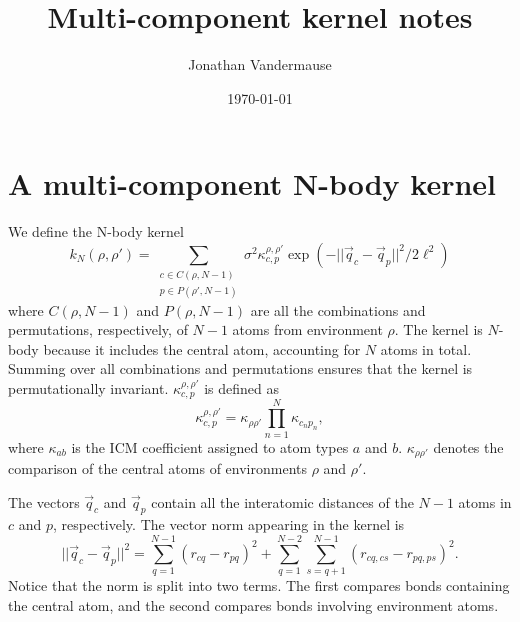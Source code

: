 \documentclass[%
preprint,
amsmath,amssymb,
aps,
]{revtex4-1}
\begin{document}
\title{Multi-component kernel notes}

\author{Jonathan Vandermause}

\date{\today}


\maketitle

\section{A multi-component N-body kernel}
We define the N-body kernel
\begin{equation}
k_{N} (\rho, \rho') = \sum\limits_{\substack{c \in C(\rho, N-1) \\ p \in P(\rho', N-1)}}  \sigma^2 \kappa_{c,p}^{\rho,\rho'} \exp(-||\vec{q}_c - \vec{q}_p||^2 / 2 \ell^2)
\end{equation}
where $C(\rho, N-1)$ and $P(\rho, N-1)$ are all the combinations and permutations, respectively, of $N-1$ atoms from environment $\rho$. The kernel is $N$-body because it includes the central atom, accounting for $N$ atoms in total. Summing over all combinations and permutations ensures that the kernel is permutationally invariant. $\kappa_{c,p}^{\rho,\rho'}$ is defined as
\begin{equation}
\kappa_{c,p}^{\rho,\rho'} = \kappa_{\rho\rho'} \prod_{n=1}^N \kappa_{c_n p_n},
\end{equation}
where $\kappa_{ab}$ is the ICM coefficient assigned to atom types $a$ and $b$. $\kappa_{\rho\rho'}$ denotes the comparison of the central atoms of environments $\rho$ and $\rho'$.

The vectors $\vec{q}_c$ and $\vec{q}_p$ contain all the interatomic distances of the $N-1$ atoms in $c$ and $p$, respectively. The vector norm appearing in the kernel is
\begin{equation}
||\vec{q}_c - \vec{q}_p||^2 = \sum_{q=1}^{N-1} (r_{cq} - r_{pq})^2 + \sum_{q=1}^{N-2} \sum_{s = q+1}^{N-1} (r_{cq,cs} - r_{pq,ps})^2.
\end{equation}
Notice that the norm is split into two terms. The first compares bonds containing the central atom, and the second compares bonds involving environment atoms.
\end{document}
